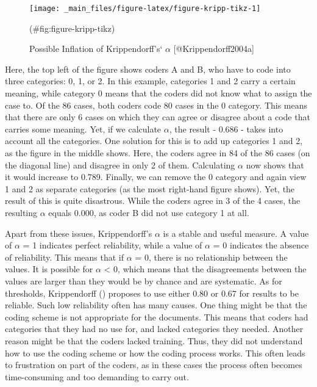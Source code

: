 \documentclass[
]{book}
\begin{document}
\hfill\break

\begin{figure}
\texttt{[image: \_main\_files/figure-latex/figure-kripp-tikz-1]} \caption{Possible Inflation of Krippendorff's` $\alpha$ [@Krippendorff2004a]}(\#fig:figure-kripp-tikz)
\end{figure}

\hfill\break

Here, the top left of the figure shows coders A and B, who have to code into three categories: 0, 1, or 2. In this example, categories 1 and 2 carry a certain meaning, while category 0 means that the coders did not know what to assign the case to. Of the 86 cases, both coders code 80 cases in the 0 category. This means that there are only 6 cases on which they can agree or disagree about a code that carries some meaning. Yet, if we calculate \(\alpha\), the result - 0.686 - takes into account all the categories. One solution for this is to add up categories 1 and 2, as the figure in the middle shows. Here, the coders agree in 84 of the 86 cases (on the diagonal line) and disagree in only 2 of them. Calculating \(\alpha\) now shows that it would increase to 0.789. Finally, we can remove the 0 category and again view 1 and 2 as separate categories (as the most right-hand figure shows). Yet, the result of this is quite disastrous. While the coders agree in 3 of the 4 cases, the resulting \(\alpha\) equals 0.000, as coder B did not use category 1 at all.

Apart from these issues, Krippendorff's \(\alpha\) is a stable and useful measure. A value of \(\alpha\) = 1 indicates perfect reliability, while a value of \(\alpha\) = 0 indicates the absence of reliability. This means that if \(\alpha\) = 0, there is no relationship between the values. It is possible for \(\alpha\) \textless{} 0, which means that the disagreements between the values are larger than they would be by chance and are systematic. As for thresholds, Krippendorff () proposes to use either 0.80 or 0.67 for results to be reliable. Such low reliability often has many causes. One thing might be that the coding scheme is not appropriate for the documents. This means that coders had categories that they had no use for, and lacked categories they needed. Another reason might be that the coders lacked training. Thus, they did not understand how to use the coding scheme or how the coding process works. This often leads to frustration on part of the coders, as in these cases the process often becomes time-consuming and too demanding to carry out.
\end{document}
